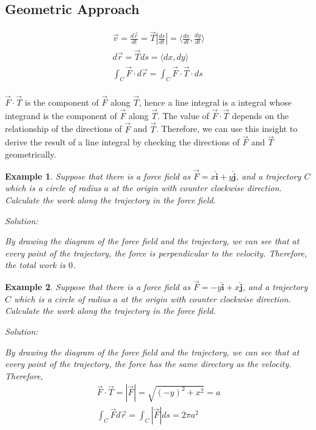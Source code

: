 \documentclass{article}
\newtheorem{example}{Example}
\newcommand{\uvec}[1]{\boldsymbol{\hat{\textbf{#1}}}}
\begin{document}
\subsection{Geometric Approach}

\begin{gather*}
  \vec{v} = \frac{d\vec{r}}{dt} = \vec{T} |\frac{ds}{dt}| = \langle \frac{dx}{dt}, \frac{dy}{dt} \rangle \\
  d\vec{r} = \vec{T} ds = \langle dx, dy \rangle \\
  \int_C \vec{F} \cdot d\vec{r} = \int_C \vec{F} \cdot \vec{T} \cdot ds \\
\end{gather*}

$\vec{F} \cdot \vec{T}$ is the component of $\vec{F}$ along $\vec{T}$, hence a 
line integral is a integral whose integrand is the component of $\vec{F}$ along 
$\vec{T}$. The value of $\vec{F} \cdot \vec{T}$ depends on the relationship of 
the directions of $\vec{F}$ and $\vec{T}$. Therefore, we can use this insight to 
derive the result of a line integral by checking the directions of $\vec{F}$ and 
$\vec{T}$ geometrically.

\begin{example}
  Suppose that there is a force field as $\vec{F} = x \uvec{i} + y \uvec{j}$, 
  and a trajectory $C$ which is a circle of radius $a$ at the origin with 
  counter clockwise direction. Calculate the work along the trajectory in the 
  force field.

  Solution:

  By drawing the diagram of the force field and the trajectory, we can see that 
  at every point of the trajectory, the force is perpendicular to the velocity. 
  Therefore, the total work is $0$.
\end{example}

\begin{example}
  Suppose that there is a force field as $\vec{F} = -y \uvec{i} + x \uvec{j}$, 
  and a trajectory $C$ which is a circle of radius $a$ at the origin with 
  counter clockwise direction. Calculate the work along the trajectory in the 
  force field.

  Solution:

  By drawing the diagram of the force field and the trajectory, we can see that 
  at every point of the trajectory, the force has the same directory as the 
  velocity. Therefore,
  \begin{gather*}
    \vec{F} \cdot \vec{T} = |\vec{F}| = \sqrt{(-y)^2 + x^2} = a \\
    \int_C \vec{F} d\vec{r} = \int_C |\vec{F}| ds = 2\pi a^2 \\
  \end{gather*}
\end{example}
\end{document}
